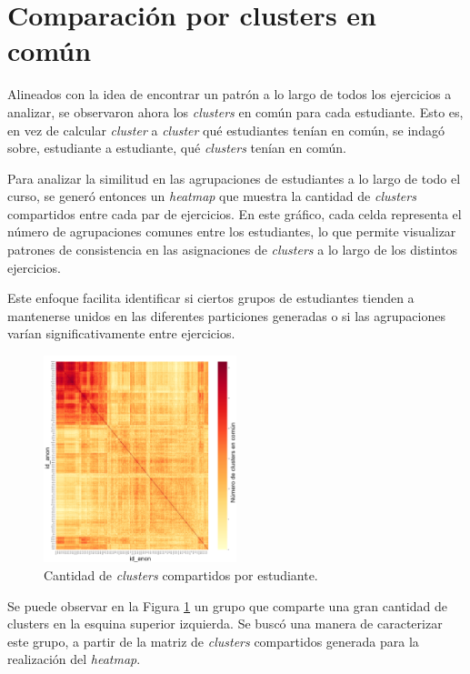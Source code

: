 \documentclass[11pt,a4paper,twoside,openany]{tesis}
\begin{document}
\section{Comparación por clusters en común}

Alineados con la idea de encontrar un patrón a lo largo de todos los ejercicios a analizar, se observaron ahora los \emph{clusters} en común para cada estudiante. Esto es, en vez de calcular \emph{cluster} a \emph{cluster} qué estudiantes tenían en común, se indagó sobre, estudiante a estudiante, qué \emph{clusters} tenían en común. 

Para analizar la similitud en las agrupaciones de estudiantes a lo largo de todo el curso, se generó entonces un \emph{heatmap} que muestra la cantidad de \emph{clusters} compartidos entre cada par de ejercicios. En este gráfico, cada celda representa el número de agrupaciones comunes entre los estudiantes, lo que permite visualizar patrones de consistencia en las asignaciones de \emph{clusters} a lo largo de los distintos ejercicios. 

Este enfoque facilita identificar si ciertos grupos de estudiantes tienden a mantenerse unidos en las diferentes particiones generadas o si las agrupaciones varían significativamente entre ejercicios.

\begin{figure}[H]

    \centering
    \includegraphics[width=0.5\textwidth]{imagenes/cluster.png}
    \caption{Cantidad de \emph{clusters} compartidos por estudiante.}
    \label{cluster}
\end{figure}

Se puede observar en la Figura \ref{cluster} un grupo que comparte una gran cantidad de clusters en la esquina superior izquierda. Se buscó una manera de caracterizar este grupo, a partir de la matriz de \emph{clusters} compartidos generada para la realización del \emph{heatmap}.  
\end{document}
